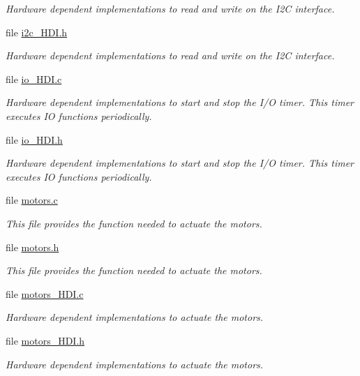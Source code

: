 \begin{DoxyCompactItemize}
\begin{DoxyCompactList}\small\item\em Hardware dependent implementations to read and write on the I2\+C interface. \end{DoxyCompactList}\item 
file \hyperlink{i2c__HDI_8h}{i2c\+\_\+\+H\+D\+I.\+h}
\begin{DoxyCompactList}\small\item\em Hardware dependent implementations to read and write on the I2\+C interface. \end{DoxyCompactList}\item 
file \hyperlink{io__HDI_8c}{io\+\_\+\+H\+D\+I.\+c}
\begin{DoxyCompactList}\small\item\em Hardware dependent implementations to start and stop the I/\+O timer. This timer executes I\+O functions periodically. \end{DoxyCompactList}\item 
file \hyperlink{io__HDI_8h}{io\+\_\+\+H\+D\+I.\+h}
\begin{DoxyCompactList}\small\item\em Hardware dependent implementations to start and stop the I/\+O timer. This timer executes I\+O functions periodically. \end{DoxyCompactList}\item 
file \hyperlink{motors_8c}{motors.\+c}
\begin{DoxyCompactList}\small\item\em This file provides the function needed to actuate the motors. \end{DoxyCompactList}\item 
file \hyperlink{motors_8h}{motors.\+h}
\begin{DoxyCompactList}\small\item\em This file provides the function needed to actuate the motors. \end{DoxyCompactList}\item 
file \hyperlink{motors__HDI_8c}{motors\+\_\+\+H\+D\+I.\+c}
\begin{DoxyCompactList}\small\item\em Hardware dependent implementations to actuate the motors. \end{DoxyCompactList}\item 
file \hyperlink{motors__HDI_8h}{motors\+\_\+\+H\+D\+I.\+h}
\begin{DoxyCompactList}\small\item\em Hardware dependent implementations to actuate the motors. \end{DoxyCompactList}\item 

\end{DoxyCompactItemize}
